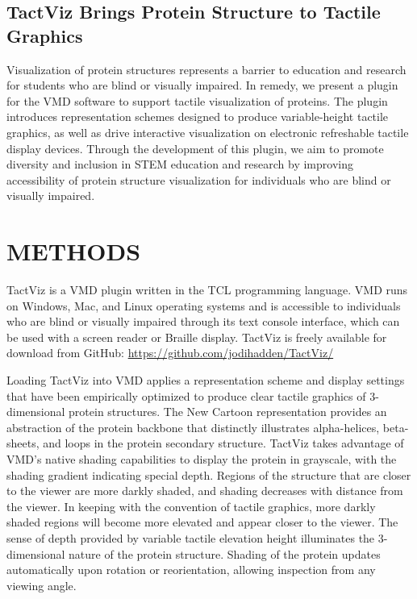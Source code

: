 \documentclass[11.5pt]{sig-alternate} %
\begin{document}
\begin{large}
\subsection*{TactViz Brings Protein Structure to Tactile Graphics}

Visualization of protein structures represents a barrier to education and research for students who are blind or visually impaired. In remedy, we present a plugin for the VMD software to support tactile visualization of proteins. The plugin introduces representation schemes designed to produce variable-height tactile graphics, as well as drive interactive visualization on electronic refreshable tactile display devices. Through the development of this plugin, we aim to promote diversity and inclusion in STEM education and research by improving accessibility of protein structure visualization for individuals who are blind or visually impaired.

\section*{METHODS}

TactViz is a VMD plugin written in the TCL programming language. VMD runs on Windows, Mac, and Linux operating systems and is accessible to individuals who are blind or visually impaired through its text console interface, which can be used with a screen reader or Braille display. TactViz is freely available for download from GitHub: \url{https://github.com/jodihadden/TactViz/}

Loading TactViz into VMD applies a representation scheme and display settings that have been empirically optimized to produce clear tactile graphics of 3-dimensional protein structures. The New Cartoon representation provides an abstraction of the protein backbone that distinctly illustrates alpha-helices, beta-sheets, and loops in the protein secondary structure. TactViz takes advantage of VMD’s native shading capabilities to display the protein in grayscale, with the shading gradient indicating special depth. Regions of the structure that are closer to the viewer are more darkly shaded, and shading decreases with distance from the viewer. In keeping with the convention of tactile graphics, more darkly shaded regions will become more elevated and appear closer to the viewer. The sense of depth provided by variable tactile elevation height illuminates the 3-dimensional nature of the protein structure. Shading of the protein updates automatically upon rotation or reorientation, allowing inspection from any viewing angle.


\end{large}
\end{document}
